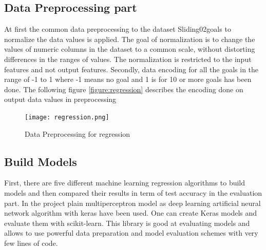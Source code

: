 \subsection{Data Preprocessing part}
At first the common data preprocessing to the dataset Sliding02goals to normalize the data values is applied.\newline
The goal of normalization is to change the values of numeric columns in the dataset to a common scale, without distorting differences in the ranges of values. The normalization is restricted to the input features and not output features.\newline
Secondly, data encoding for all the goals in the range of -1 to 1 where -1 means no goal and 1 is for 10 or more goals has been done. 
The following figure \autoref{figure:regression} describes the encoding done on output data values in preprocessing
\begin{figure}[H]
\begin{center}
\texttt{[image: regression.png]}
\end{center}
\caption{Data Preprocessing for regression }
\label{figure:regression}
\end{figure}
\subsection{Build Models }
First, there are five different machine learning regression algorithms to build models and then compared their results in term of test accuracy in the evaluation part.\newline \newline
In the project plain multiperceptron model as deep learning artificial neural network algorithm with keras have been used. One can create Keras models and evaluate them with scikit-learn. This library is good at evaluating models and allows to use powerful data preparation and model evaluation schemes with very few lines of code.
